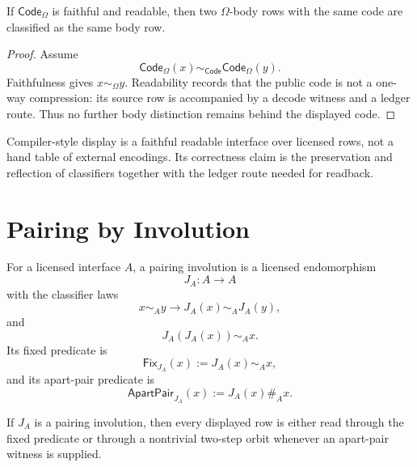 \begin{theorem}
\label{thm:omega-generation-code-excludes-hidden-body-rows}
If $\mathsf{Code}_{\Omega}$ is faithful and readable, then two
$\Omega$-body rows with the same code are classified as the same body row.
\end{theorem}

\begin{proof}
Assume
$$
\mathsf{Code}_{\Omega}(x)
\sim_{\mathsf{Code}}
\mathsf{Code}_{\Omega}(y).
$$
Faithfulness gives $x\sim_{\Omega}y$. Readability records that the public
code is not a one-way compression: its source row is accompanied by a
decode witness and a ledger route. Thus no further body distinction remains
behind the displayed code.
\end{proof}

\begin{corollary}
\label{cor:omega-generation-compiler-display-boundary}
Compiler-style display is a faithful readable interface over
licensed rows, not a hand table of external encodings. Its correctness
claim is the preservation and reflection of classifiers together with the
ledger route needed for readback.
\end{corollary}

\section{Pairing by Involution}
\label{sec:omega-generation-pairing-involution}

\begin{definition}
\label{def:omega-generation-pairing-involution}
For a licensed interface $A$, a pairing involution is a licensed
endomorphism
$$
J_A:A\to A
$$
with the classifier laws
$$
x\sim_A y
\to
J_A(x)\sim_A J_A(y),
$$
and
$$
J_A(J_A(x))\sim_A x.
$$
Its fixed predicate is
$$
\mathsf{Fix}_{J_A}(x):=
J_A(x)\sim_A x,
$$
and its apart-pair predicate is
$$
\mathsf{ApartPair}_{J_A}(x):=
J_A(x)\#_A x.
$$
\end{definition}

\begin{theorem}
\label{thm:omega-generation-pairing-orbits-typed}
If $J_A$ is a pairing involution, then every displayed row is either read
through the fixed predicate or through a nontrivial two-step orbit whenever
an apart-pair witness is supplied.
\end{theorem}

